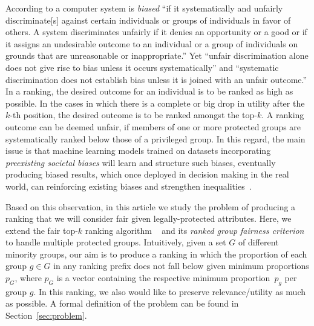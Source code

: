 According to \citet{friedman1996bias} a computer system is \emph{biased} ``if it systematically and unfairly discriminate[s] against certain individuals or groups of individuals in favor of others.
%
A system discriminates unfairly if it denies an opportunity or a good or if it assigns an undesirable outcome to an individual or a group of individuals on grounds that are unreasonable or inappropriate.''
%
Yet ``unfair discrimination alone does not give rise to bias unless it occurs systematically'' and ``systematic discrimination does not establish bias unless it is joined with an unfair outcome.''
%
In a ranking, the desired outcome for an individual is to be ranked as high as possible. In the cases in which there is a complete or big drop in utility after the $k$-th position, the desired outcome is to be ranked amongst the top-$k$. A ranking outcome can be deemed unfair, if members of one or more protected groups are systematically ranked below those of a privileged group.
%
%
In this regard, the main issue is that machine learning models trained on datasets incorporating \textit{preexisting societal biases} will learn and structure such biases, eventually producing biased results, which once deployed in decision making in the real world, can reinforcing existing biases and strengthen inequalities~\cite{oneil2016weapons}.
%

Based on this observation, in this article we study the problem of producing a ranking that we will consider fair given legally-protected attributes.
%
Here, we extend the fair top-$k$ ranking algorithm \algoFAIR ~\cite{zehlike2017fair} and its \emph{ranked group fairness criterion} to handle multiple protected groups.
%
Intuitively, given a set $G$ of different minority groups, our aim is to produce a ranking in which the proportion of each group $g \in G$ in any ranking prefix does not fall below given minimum proportions $p_G$, where $p_G$ is a vector containing the respective minimum proportion~$p_g$ per group $g$. 
%
In this ranking, we also would like to preserve relevance/utility as much as possible.
%
A formal definition of the problem can be found in Section~\ref{sec:problem}.

